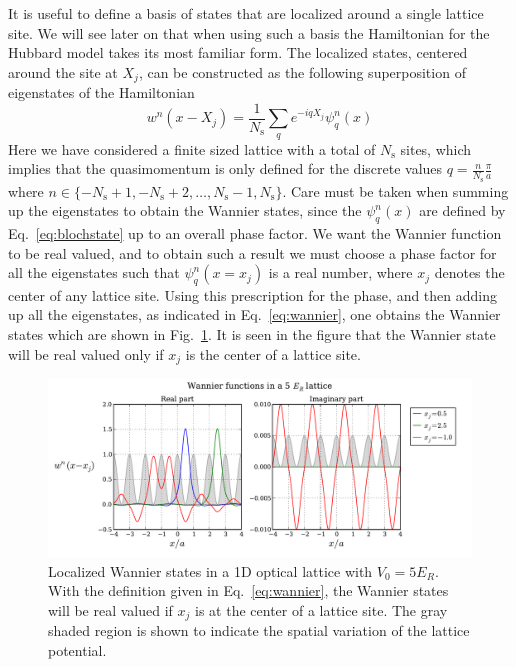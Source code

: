\documentclass[11pt,letter]{article}
\newcommand{\vo}{\ensuremath{V_{0}}}
\begin{document}
It is useful to define a basis of states that are localized around a single
lattice site.  We will see later on that when using such a basis the
Hamiltonian for the Hubbard model takes its most familiar form.    The
localized states, centered around the site at $X_{j}$, can be constructed as the following superposition of
eigenstates of the Hamiltonian 
\begin{equation}
 w^{n}(x-X_{j}) =  \frac{1}{N_{\mathrm{s}}} \sum_{q}  e^{-i q X_{j} } \psi_{q}^{n}(x) 
 \label{eq:wannier}
\end{equation}
Here we have considered a finite sized lattice with a total of $N_{\mathrm{s}}$
sites,  which implies that the quasimomentum is only defined for the discrete
values $q = \frac{n}{N_{\mathrm{s}}} \frac{\pi}{a}$ where 
$ n \in \lbrace
-N_{\mathrm{s}}+1, -N_{\mathrm{s}}+2, \ldots, N_{\mathrm{s}}-1,  N_{\mathrm{s}}  \rbrace$.
Care must be taken when summing up the eigenstates to obtain the Wannier
states, since the $\psi_{q}^{n}(x)$ are defined by Eq.~\ref{eq:blochstate} up
to an overall phase factor.   We want the Wannier function to be real valued,
and to obtain such a result we must choose a phase factor for all the
eigenstates such that $\psi_{q}^{n}(x=x_{j})$ is a real number, where $x_{j}$
denotes the center of any lattice site.   Using this prescription for the
phase,  and then adding up all the eigenstates, as indicated in
Eq.~\ref{eq:wannier}, one obtains the Wannier states which are shown in
Fig.~\ref{fig:wannier1d}.   It is seen in the figure that the Wannier state
will be real valued only if $x_{j}$ is the center of a lattice site. 
\begin{figure}
\centering \includegraphics[width=\textwidth]{../BandStructure_figures/wannier1d.pdf}
\caption[Wannier states in 1D lattice.]{\small Localized Wannier states in a 1D
optical lattice with $\vo=5E_{R}$.  With the definition given in
Eq.~\ref{eq:wannier}, the Wannier states will be real valued if $x_{j}$ is at
the center of a lattice site.  The gray shaded region is shown to indicate the
spatial variation of the lattice potential.  } \label{fig:wannier1d}
\end{figure}
\end{document}
